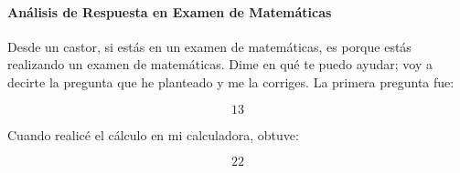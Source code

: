 


\paragraph{Análisis de Respuesta en Examen de Matemáticas}

Desde un castor, si estás en un examen de matemáticas, es porque estás realizando un examen de matemáticas. Dime en qué te puedo ayudar; voy a decirte la pregunta que he planteado y me la corriges. La primera pregunta fue:

\[
13
\]

Cuando realicé el cálculo en mi calculadora, obtuve:

\[
22
\]

